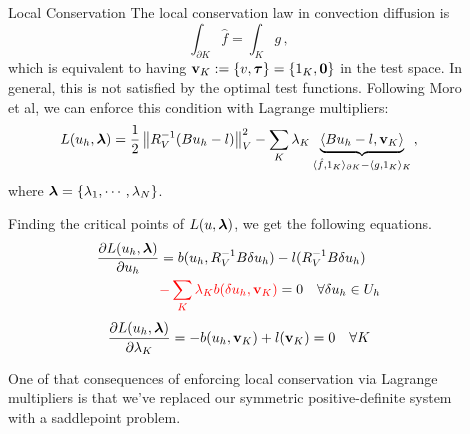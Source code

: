 \documentclass[final]{beamer}
\newlength{\sepwid}
\newlength{\onecolwid}
\begin{document}
\begin{frame}[t]
\begin{columns}[t]
\begin{column}{\onecolwid}
\begin{block}{Local Conservation}
The local conservation law in convection diffusion is
\[
\int_{\partial K}\hat f=\int_K g\,,
\]
which is equivalent to having $\mathbf{v}_K:=\{v,\boldsymbol\tau\}=\{1_K,\boldsymbol0\}$ in the test space.
In general, this is not satisfied by the optimal test functions.
Following Moro et al\cite{MoroNguyenPeraire11}, we
can enforce this condition with Lagrange multipliers:
\begin{align*}
L(u_h,\boldsymbol\lambda) = \frac{1}{2}\left\| R_V^{-1}(Bu_h-l) \right\|_V^2
-\sum_K\lambda_K\underbrace{\langle Bu_h-l,\mathbf{v}_K\rangle}_
{\langle\hat f, 1_K\rangle_{\partial K}-\langle g,1_K\rangle_K}\,,
\end{align*}
where $\boldsymbol\lambda=\{\lambda_1,\cdots,\lambda_N\}$.

Finding the critical points of $L(u,\boldsymbol\lambda)$, we get the following
equations.
\begin{align*}
\frac{\partial L(u_h,\boldsymbol\lambda)}{\partial u_h}&=b(u_h,R_V^{-1}B\delta u_h)
-l(R_V^{-1}B\delta u_h)\\
&{\color{red}-\sum_K\lambda_K b(\delta
u_h,\mathbf{v}_K)}=0\quad\forall\delta u_h\in U_h
\end{align*}
\[
\frac{\partial
L(u_h,\boldsymbol\lambda)}{\partial\lambda_K}=-b(u_h,\mathbf{v}_K)+l(\mathbf{v}_K)=0\quad\forall
K
\]

One of that consequences of enforcing local conservation via Lagrange multipliers
is that we've replaced our symmetric positive-definite system with a
saddlepoint problem.


\end{block}


\end{column} %

\begin{column}{\sepwid}\end{column} %

\begin{column}{\onecolwid} %



\end{column}
\end{columns}
\end{frame}
\end{document}
